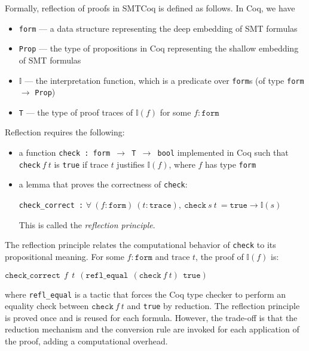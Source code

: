 \documentclass{article}
\begin{document}
	Formally, reflection of proofs 
	in SMTCoq is defined as follows. 
	In Coq, we have 
	\begin{itemize}
		\item \texttt{form} --- a data 
		structure representing the deep 
		embedding of SMT formulas
		\item \texttt{Prop} --- the type
		of propositions in Coq 
		representing the shallow 
		embedding of SMT formulas
		\item $\mathbb{I}$ --- the 
		interpretation function, which 
		is a predicate over \texttt{form}s 
		(of type \texttt{form} $\to$ 
		\texttt{Prop})
		\item \texttt{T} --- the type of 
		proof traces of $\mathbb{I} (f)$ 
		for some $f : \texttt{form}$
	\end{itemize}
	Reflection requires the following:
	\begin{itemize}
		\item a function 
		\texttt{check : form $\to$ T $\to$ 
		bool} implemented in Coq such that 
		\texttt{check}$\ f\ t$ is 
		\texttt{true} if trace $t$
		justifies $\mathbb{I}(f)$,
		where $f$ has type 
		\texttt{form}
		\item a lemma that proves the 
		correctness of \texttt{check}:
		\begin{center}
			\texttt{check\_correct :}
			$\forall\ (f : \texttt{form})\ 
			(t : \texttt{trace}),\ 
			\texttt{check}\ s\ t\ = 
			\texttt{true} \to \mathbb{I}(s)$
		\end{center}
		This is called the 
		\textit{reflection principle}.
	\end{itemize}
	The reflection principle relates 
	the computational behavior of 
	\texttt{check} to its propositional 
	meaning. For some $f : \texttt{form}$
	and trace $t$, the proof of 
	$\mathbb{I}(f)$ is:
	\begin{center}
		$\texttt{check\_correct}\ \ 
		f\ \ t\ \ (\texttt{refl\_equal}\ \ 
		(\texttt{check}\ f\ t)\ \ 
		\texttt{true})$
	\end{center}
	where \texttt{refl\_equal} is a tactic
	that forces the Coq type checker to 
	perform an equality check between 
	$\texttt{check}\ f\ t$ and \texttt{true}
	by reduction. The reflection principle 
	is proved once and is reused for 
	each formula. However, the trade-off is 
	that the reduction mechanism and the 
	conversion rule are invoked for each 
	application of the proof, adding a 
	computational overhead. 
	
\end{document}
